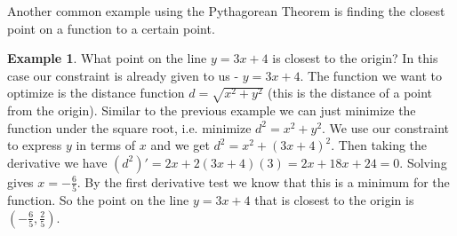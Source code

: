 \documentclass[12pt,reqno]{article}
\theoremstyle{definition}
\newtheorem*{Example}{Example}
\begin{document}
	Another common example using the Pythagorean Theorem is finding the closest point on a function to a certain point. 
	\begin{Example}
		What point on the line $y = 3x + 4$ is closest to the origin? In this case our constraint is already given to us - $y = 3x + 4$. The function we want to optimize is the distance function $d = \sqrt{x^2 + y^2}$ (this is the distance of a point from the origin). Similar to the previous example we can just minimize the function under the square root, i.e. minimize $d^2 = x^2 + y^2$. We use our constraint to express $y$ in terms of $x$ and we get $d^2 = x^2 + (3x + 4)^2$. Then taking the derivative we have $(d^2)' = 2x + 2(3x + 4)(3) = 2x + 18x + 24 = 0$. Solving gives $x = -\frac{6}{5}$. By the first derivative test we know that this is a minimum for the function. So the point on the line $y = 3x + 4$ that is closest to the origin is $\left(-\frac{6}{5}, \frac{2}{5}\right)$. 
	\end{Example}
	
\end{document}
